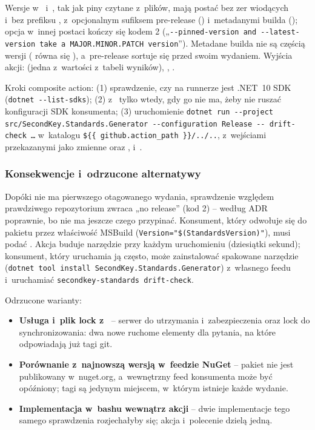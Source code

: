 Wersje w~ i~, tak jak piny czytane
z~plików, mają postać  bez zer wiodących i~bez prefiksu
, z~opcjonalnym sufiksem pre-release () i~metadanymi builda
(); opcja w~innej postaci kończy się kodem 2 („\texttt{-{}-pinned-version
and -{}-latest-version take a MAJOR.MINOR.PATCH version}”). Metadane builda nie są częścią
wersji ( równa się ), a~pre-release sortuje się
przed swoim wydaniem. Wyjścia akcji:  (jedna z~wartości
z~tabeli wyników), , .

Kroki composite action: (1) sprawdzenie, czy na runnerze jest .NET~10 SDK (\texttt{dotnet
-{}-list-sdks}); (2)  z~ tylko wtedy, gdy
go nie ma, żeby nie ruszać konfiguracji SDK konsumenta; (3) uruchomienie
\texttt{dotnet run -{}-project src/SecondKey.Standards.Generator -{}-configuration Release -{}-
drift-check …} w~katalogu \texttt{\$\{\{ github.action\_path \}\}/../..}, z~wejściami
przekazanymi jako zmienne  oraz ,
 i~.

\subsubsection{Konsekwencje i~odrzucone alternatywy}

Dopóki nie ma pierwszego otagowanego wydania, sprawdzenie względem prawdziwego repozytorium
zwraca „no release” (kod 2) -- według ADR poprawnie, bo nie ma jeszcze czego przypinać.
Konsument, który odwołuje się do pakietu przez właściwość MSBuild
(\texttt{Version="\$(StandardsVersion)"}), musi podać . Akcja
buduje narzędzie przy każdym uruchomieniu (dziesiątki sekund); konsument, który uruchamia ją
często, może zainstalować spakowane narzędzie
(\texttt{dotnet tool install SecondKey.Standards.Generator}) z~własnego feedu i~uruchamiać
\texttt{secondkey-standards drift-check}.

Odrzucone warianty:
\begin{itemize}
  \item \textbf{Usługa i~plik lock z~} -- serwer do utrzymania
        i~zabezpieczenia oraz lock do synchronizowania: dwa nowe ruchome elementy dla pytania,
        na które odpowiadają już tagi git.
  \item \textbf{Porównanie z~najnowszą wersją w~feedzie NuGet} -- pakiet nie jest publikowany
        w~nuget.org, a~wewnętrzny feed konsumenta może być opóźniony; tagi są jedynym
        miejscem, w~którym istnieje każde wydanie.
  \item \textbf{Implementacja w~bashu wewnątrz akcji} -- dwie implementacje tego samego
        sprawdzenia rozjechałyby się; akcja i~polecenie dzielą jedną.
\end{itemize}

